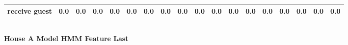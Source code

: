\documentclass{article}
\begin{document}
\begin{sideways}
\begin{tabular}{lrrrrrrrrrrrrrrrrr}
receive guest                 &         0.0 &                0.0 &           0.0 &               0.0 &                0.0 &                0.0 &              0.0 &                      0.0 &                   0.0 &              0.0 &              0.0 &                            0.0 &                      0.0 &                    0.0 &                                  0.0 &                          0.0 &                  0.0 \\
\bottomrule
\end{tabular}
\end{sideways}
\normalsize
\vspace{1cm}\\
\textbf{House A Model HMM Feature Last}\\
\vspace{1cm}\\
\end{document}
